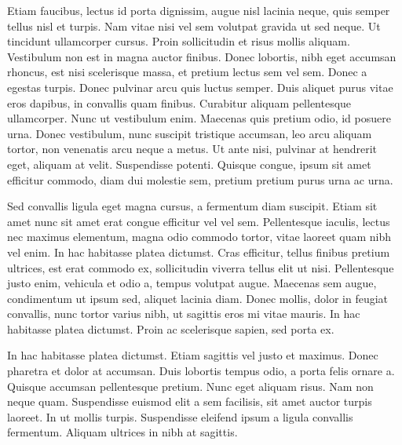 \documentclass{book}
\begin{document}
            Etiam faucibus, lectus id porta dignissim, augue nisl lacinia neque, quis semper
               tellus nisl et turpis. Nam vitae nisi vel sem volutpat gravida ut sed neque. Ut
               tincidunt ullamcorper cursus. Proin sollicitudin et risus mollis aliquam. Vestibulum
               non est in magna auctor finibus. Donec lobortis, nibh eget accumsan rhoncus, est nisi
               scelerisque massa, et pretium lectus sem vel sem. Donec a egestas turpis. Donec
               pulvinar arcu quis luctus semper. Duis aliquet purus vitae eros dapibus, in convallis
               quam finibus. Curabitur aliquam pellentesque ullamcorper. Nunc ut vestibulum enim.
               Maecenas quis pretium odio, id posuere urna. Donec vestibulum, nunc suscipit
               tristique accumsan, leo arcu aliquam tortor, non venenatis arcu neque a metus. Ut
               ante nisi, pulvinar at hendrerit eget, aliquam at velit. Suspendisse potenti. Quisque
               congue, ipsum sit amet efficitur commodo, diam dui molestie sem, pretium pretium
               purus urna ac urna.

            Sed convallis ligula eget magna cursus, a fermentum diam suscipit. Etiam sit amet
               nunc sit amet erat congue efficitur vel vel sem. Pellentesque iaculis, lectus nec
               maximus elementum, magna odio commodo tortor, vitae laoreet quam nibh vel enim. In
               hac habitasse platea dictumst. Cras efficitur, tellus finibus pretium ultrices, est
               erat commodo ex, sollicitudin viverra tellus elit ut nisi. Pellentesque justo enim,
               vehicula et odio a, tempus volutpat augue. Maecenas sem augue, condimentum ut ipsum
               sed, aliquet lacinia diam. Donec mollis, dolor in feugiat convallis, nunc tortor
               varius nibh, ut sagittis eros mi vitae mauris. In hac habitasse platea dictumst.
               Proin ac scelerisque sapien, sed porta ex.

            In hac habitasse platea dictumst. Etiam sagittis vel justo et maximus. Donec pharetra
               et dolor at accumsan. Duis lobortis tempus odio, a porta felis ornare a. Quisque
               accumsan pellentesque pretium. Nunc eget aliquam risus. Nam non neque quam.
               Suspendisse euismod elit a sem facilisis, sit amet auctor turpis laoreet. In ut
               mollis turpis. Suspendisse eleifend ipsum a ligula convallis fermentum. Aliquam
               ultrices in nibh at sagittis.
\end{document}
